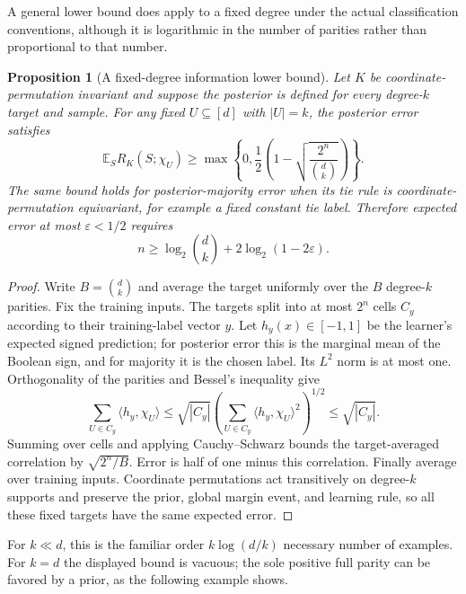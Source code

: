\documentclass[11pt]{article}
\newtheorem{proposition}[theorem]{Proposition}
\theoremstyle{remark}\newtheorem{remark}[theorem]{Remark}
\newcommand{\E}{\mathbb E}
\begin{document}
A general lower bound does apply to a fixed degree under the actual classification conventions, although it is logarithmic in the number of parities rather than proportional to that number.
\begin{proposition}[A fixed-degree information lower bound]\label{prop:information}
Let $K$ be coordinate-permutation invariant and suppose the posterior is defined for every degree-$k$ target and sample. For any fixed $U\subseteq[d]$ with $|U|=k$, the posterior error satisfies
\begin{equation}\label{eq:information}
 \E_S R_K(S;\chi_U)\ge
 \max\left\{0,\frac12\left(1-\sqrt{\frac{2^n}{\binom dk}}\right)\right\}.
\end{equation}
The same bound holds for posterior-majority error when its tie rule is coordinate-permutation equivariant, for example a fixed constant tie label. Therefore expected error at most $\varepsilon<1/2$ requires
\[
 n\ge\log_2\binom dk+2\log_2(1-2\varepsilon).
\]
\end{proposition}
\begin{proof}
Write $B=\binom dk$ and average the target uniformly over the $B$ degree-$k$ parities. Fix the training inputs. The targets split into at most $2^n$ cells $C_y$ according to their training-label vector $y$. Let $h_y(x)\in[-1,1]$ be the learner's expected signed prediction; for posterior error this is the marginal mean of the Boolean sign, and for majority it is the chosen label. Its $L^2$ norm is at most one. Orthogonality of the parities and Bessel's inequality give
\[
 \sum_{U\in C_y}\langle h_y,\chi_U\rangle
 \le\sqrt{|C_y|}
 \left(\sum_{U\in C_y}\langle h_y,\chi_U\rangle^2\right)^{1/2}
 \le\sqrt{|C_y|}.
\]
Summing over cells and applying Cauchy--Schwarz bounds the target-averaged correlation by $\sqrt{2^n/B}$. Error is half of one minus this correlation. Finally average over training inputs. Coordinate permutations act transitively on degree-$k$ supports and preserve the prior, global margin event, and learning rule, so all these fixed targets have the same expected error.
\end{proof}
For $k\ll d$, this is the familiar order $k\log(d/k)$ necessary number of examples. For $k=d$ the displayed bound is vacuous; the sole positive full parity can be favored by a prior, as the following example shows.
\end{document}
